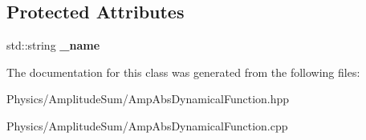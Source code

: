 \subsection*{Protected Attributes}
\begin{DoxyCompactItemize}
\item 
\hypertarget{class_amp_abs_dynamical_function_aa7c6f2ca7dafa5c9af7e9a7af77a0df1}{std\-::string {\bfseries \-\_\-name}}\label{class_amp_abs_dynamical_function_aa7c6f2ca7dafa5c9af7e9a7af77a0df1}

\end{DoxyCompactItemize}


The documentation for this class was generated from the following files\-:\begin{DoxyCompactItemize}
\item 
Physics/\-Amplitude\-Sum/Amp\-Abs\-Dynamical\-Function.\-hpp\item 
Physics/\-Amplitude\-Sum/Amp\-Abs\-Dynamical\-Function.\-cpp\end{DoxyCompactItemize}
